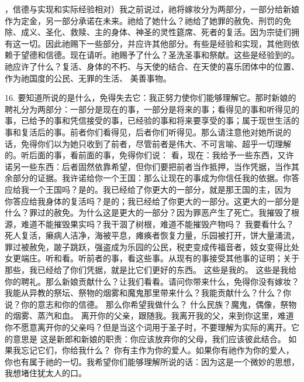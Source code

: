 ，信德与实现和实际经验相对）我之前说过，祂将嫁妆分为两部分，一部分给新娘作为定金，另一部分承诺在未来。祂给了她什么？祂给了她罪的赦免、刑罚的免除、成义、圣化、救赎、主的身体、神圣的灵性筵席、死者的复活。因为宗徒们拥有这一切。因此祂赐下一些部分，并应许其他部分。有些是经验和实现，其他则依赖于望德和信德。现在请听。祂赐予了什么？圣洗圣事和祭献。这些是经验到的。祂应许了什么？复活、身体的不朽、与天使的结合、在天使的喜乐团体中的位置、作为祂国度的公民、无罪的生活、 美善事物。\par

16. 要知道所说的是什么，免得失去它：我正努力使你们能够理解它。那时新娘的聘礼分为两部分：一部分是现在的事，一部分是将来的事；看得见的事和听得见的事，已给予的事和凭信接受的事，已经验的事和将来要享受的事；属于现世生活的事和复活后的事。前者你们看得见，后者你们听得见。那么请注意他对她所说的话，免得你们以为她只收到了前者，尽管前者是伟大、不可言喻、超乎一切理解的。听后面的事，看前面的事，免得你们说： 看，现在：我给予一些东西，又许诺另一些东西：后者固然依靠希望，但你们要把前者当作抵押，当作凭据，当作其余部分的证据。我许诺给你一个王国：那么让现在的事成为你信任我的依据。你答应给我一个王国吗？是的。我已经给了你更大的一部分，就是那王国的主，因为  你答应给我身体的复活吗？是的；我已经给了你更大的一部分。这更大的一部分是什么？罪过的赦免。为什么这是更大的一部分？因为罪恶产生了死亡。我摧毁了根源，难道不能摧毁果实吗？我干涸了树根，难道不能摧毁产物吗？ 我要看什么？死人复活，癞病人洁净，海被平息，瘫痪者恢复力量，乐园被打开，饼大量涌流，罪过被赦免，跛子跳跃，强盗成为乐园的公民，税吏变成传福音者，妓女变得比处女更端庄。听和看。听前者的事，看这些事。从现有的事接受其他事的证明；关于那些，我已经给了你们凭据，就是比它们更好的东西。 这些是我的。 这些是我给你的聘礼。那么新娘贡献什么？让我们看看。请问你带来什么，免得你没有嫁妆？我能从异教的祭坛、祭物的烟雾和魔鬼那里带来什么？我能贡献什么？什么？你说？你的意志和你的信德。 那么你希望我做什么？ 什么民族？魔鬼，偶像，祭物的烟雾、蒸汽和血。 离开你的父亲，跟随我。我离开我的父，来到你这里，难道你不愿意离开你的父亲吗？但是当这个词用于圣子时，不要理解为实际的离开。它的意思是 这是新郎和新娘的职责：你应该放弃你的父母，我们应该彼此结合。 如果我忘记它们，你给我什么？ 你有主作为你的爱人。如果你有祂作为你的爱人，你也有属于祂的一切。我希望你们能够理解所说的话：因为这是一个微妙的思想，我想堵住犹太人的口。\par

